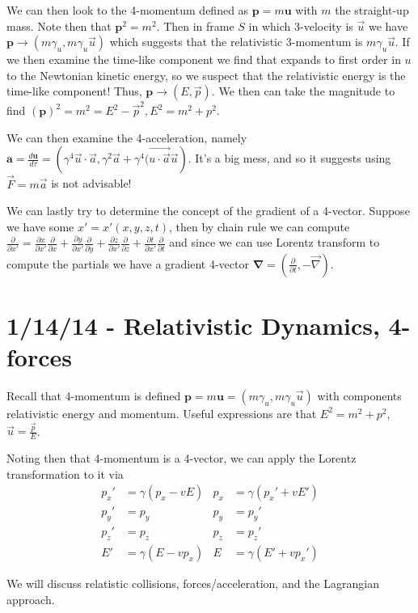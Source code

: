 \documentclass[10pt]{report}
\newcommand{\rd}[2]{\frac{d#1}{d#2}}
\newcommand{\pd}[2]{\frac{\partial #1}{\partial#2}}
\begin{document}
We can then look to the 4-momentum defined as $\mathbf{p} = m\mathbf{u}$ with $m$ the straight-up mass. Note then that $\mathbf{p}^2 = m^2$. Then in frame $S$ in which 3-velocity is $\vec{u}$ we have $\mathbf{p} \to (m\gamma_u, m\gamma_u \vec{u})$ which suggests that the relativistic 3-momentum is $m\gamma_u \vec{u}$. If we then examine the time-like component we find that expands to first order in $u$ to the Newtonian kinetic energy, so we suspect that the relativistic energy is the time-like component! Thus, $\mathbf{p} \to (E,\vec{p})$. We then can take the magnitude to find $(\mathbf{p})^2 = m^2 = E^2 - \vec{p}^2, E^2 = m^2 + p^2$.

We can then examine the 4-acceleration, namely $\mathbf{a} = \rd{\mathbf{u}}{\tau} = \left( \gamma^4\vec{u}\cdot \vec{a}, \gamma^2\vec{a} + \gamma^4(\vec{u\cdot\vec{a}}\vec{u} \right)$. It's a big mess, and so it suggests using $\vec{F} = m\vec{a}$ is not advisable!

We can lastly try to determine the concept of the gradient of a 4-vector. Suppose we have some $x' = x'(x,y,z,t)$, then by chain rule we can compute $\pd{}{x'} = \pd{x}{x'}\pd{}{x} + \pd{y}{x'}\pd{}{y} + \pd{z}{x'}\pd{}{z} + \pd{t}{x'}\pd{}{t}$ and since we can use Lorentz transform to compute the partials we have a gradient 4-vector $\mathbf{\nabla} = \left( \pd{}{t}, -\vec{\nabla} \right)$.

\chapter{1/14/14 - Relativistic Dynamics, 4-forces}

Recall that 4-momentum is defined $\mathbf{p} = m\mathbf{u} = (m\gamma_u, m\gamma_u \vec{u})$ with components relativistic energy and momentum. Useful expressions are that $E^2 = m^2 + p^2$, $\vec{u} = \frac{\vec{p}}{E}$.

Noting then that 4-momentum is a 4-vector, we can apply the Lorentz transformation to it via
\begin{align}
    p_x' &= \gamma(p_x - vE) & p_x &= \gamma(p_x' + vE')\\
    p_y' &= p_y & p_y &= p_y'\\
    p_z' &= p_z & p_z &= p_z'\\
    E' &= \gamma(E - vp_x) & E &= \gamma(E' + vp_x')
    \label{1.14.4pLorentz}
\end{align}

We will discuss relatistic collisions, forces/acceleration, and the Lagrangian approach.
\end{document}
